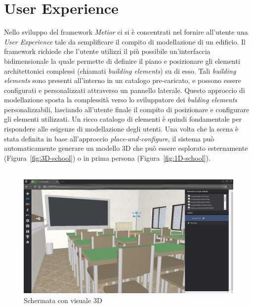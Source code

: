 \section{User Experience}
\label{sec:chapter_2_section_1}

Nello sviluppo del framework \emph{Metior} ci si è concentrati nel fornire all'utente una \emph{User Experience} tale
da semplificare il compito di modellazione di un edificio.
Il framework richiede che l'utente utilizzi il più possibile un'interfaccia bidimensionale la quale permette
di definire il piano e posizionare gli elementi architettonici complessi (chiamati \emph{building elements}) su di esso.
Tali \emph{building elements} sono presenti all'interno in un catalogo pre-caricato, e possono essere
configurati e personalizzati attraverso un pannello laterale. Questo approccio
di modellazione sposta la complessità verso lo sviluppatore dei \emph{bulding elements} personalizzabili,
lasciando all'utente finale il compito di posizionare e configurare gli elementi utilizzati.
Un ricco catalogo di elementi \`e quindi fondamentale per rispondere alle esigenze di modellazione degli utenti.
Una volta che la scena \`e stata definita in base all'approccio \emph{place-and-configure}, il sistema può automaticamente
generare un modello 3D che pu\`o essere esplorato esternamente (Figura~\ref{fig:3D-school}) o
in prima persona (Figura~\ref{fig:1D-school}).\\\\

\begin{figure}[htbp] %
   \centering
   \includegraphics[width=1\linewidth]{images/3d-school}
   \caption{Schermata con visuale 3D}
   \label{fig:3D school}
\end{figure}

